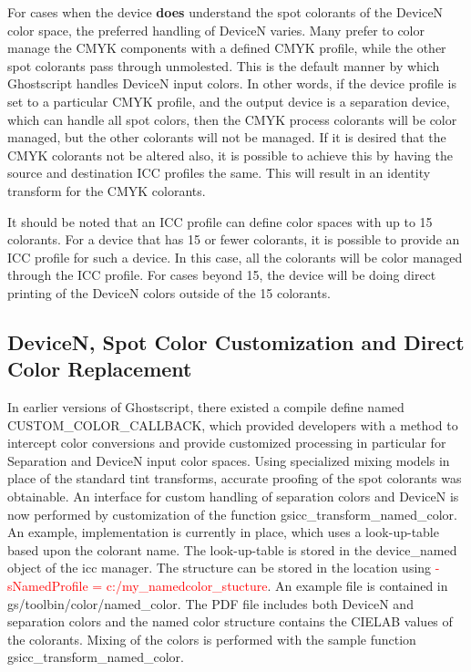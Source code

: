 \documentclass[12pt,notitlepage]{article}
\begin{document}
For cases when the device {\bf does} understand the spot colorants of the DeviceN color space, the preferred handling of DeviceN varies.  Many prefer to color manage the CMYK components with a defined CMYK profile, while the other spot colorants pass through unmolested. This is the default manner by which Ghostscript handles DeviceN input colors.  In other words, if the device profile is set to a particular CMYK profile, and the output device is a separation device, which can handle all spot colors, then the CMYK process colorants will be color managed, but the other colorants will not be managed.  If it is desired that the CMYK colorants not be altered also, it is possible to achieve this by having the source and destination ICC profiles the same.  This will result in an identity transform for the CMYK colorants.

It should be noted that an ICC profile can define color spaces with up to 15 colorants.  For a device that has 15 or fewer colorants, it is possible to provide an ICC profile for such a device.  In this case, all the colorants will be color managed through the ICC profile.  For cases beyond 15, the device will be doing direct printing of the DeviceN colors outside of the 15 colorants.

\subsection{DeviceN, Spot Color Customization and Direct Color Replacement}
\label{sec:devn}

In earlier versions of Ghostscript, there existed a compile define named \\
CUSTOM\_COLOR\_CALLBACK, which provided developers with a method to intercept color conversions and provide customized processing in particular for Separation and DeviceN input color spaces.  Using specialized mixing models in place of the standard tint transforms, accurate proofing of the spot colorants was obtainable.  An interface for custom handling of separation colors and DeviceN is now performed by customization of the function gsicc\_transform\_named\_color.  An example, implementation is currently in place, which uses a look-up-table based upon the colorant name.  The look-up-table is stored in the device\_named object of the icc manager.  The structure can be stored in the location using \textcolor{red}{-sNamedProfile = c:/my\_namedcolor\_stucture}.   An example file is contained in gs/toolbin/color/named\_color.  The PDF file includes both DeviceN and separation colors and the named color structure contains the CIELAB values of the colorants.   Mixing of the colors is performed with the sample function gsicc\_transform\_named\_color.
\end{document}
